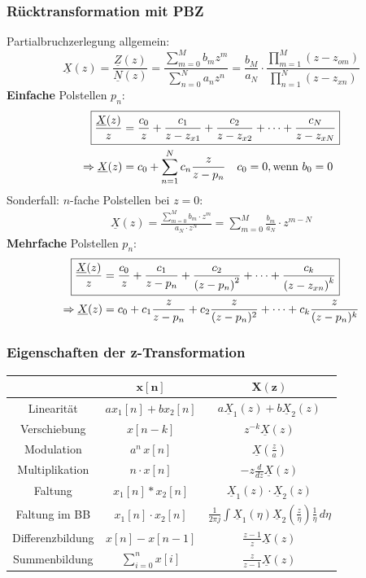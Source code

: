 \subsubsection{Rücktransformation mit PBZ}
Partialbruchzerlegung allgemein:
\[
\underline{X}(z)=\frac{\underline{Z}(z)}{\underline{N}(z)}=\frac{\sum_{m=0}^{M} b_{m} z^{m}}{\sum_{n=0}^{N} a_{n} z^{n}}=\frac{b_{M}}{a_{N}} \cdot \frac{\prod_{m=1}^{M}\left(z-z_{o m}\right)}{\prod_{n=1}^{N}\left(z-z_{x n}\right)}
\]
\textbf{Einfache} Polstellen $p_n$:
\begin{align*}
	\Aboxed{\frac{\underline{X}(z)}{z} & =\frac{c_{0}}{z}+\frac{c_{1}}{z-z_{x 1}}+\frac{c_{2}}{z-z_{x 2}}+\cdots+\frac{c_{N}}{z-z_{x N}}} \\
	\Rightarrow \underline{X}(z) &= c_0 + \sum_{n=1}^{N} c_n \frac{z}{z-p_n} \quad c_0=0, \text{wenn } b_0=0
\end{align*}
Sonderfall: $n$-fache Polstellen bei $z=0$:
\begin{align*}
	\underline{X}(z) = \frac{\sum_{m=0}^{M} b_m \cdot  z^m}{a_N \cdot z^N} = \sum_{m=0}^{M} \frac{b_m}{a_N} \cdot z^{m-N}
\end{align*}
\textbf{Mehrfache} Polstellen $p_n$:
\begin{align*}
	\Aboxed{\frac{\underline{X}(z)}{z} &=\frac{c_{0}}{z}+\frac{c_{1}}{z-p_n}+\frac{c_{2}}{\left(z-p_n\right)^{2}}+\cdots+\frac{c_{k}}{\left(z-z_{x n}\right)^{k}}}\\
			\Rightarrow \underline{X}(z) & = c_0 + c_1 \frac{z}{z-p_n}+c_2\frac{z}{(z-p_n)^2}+\cdots+c_k\frac{z}{(z-p_n)^k}
\end{align*}

\subsubsection{Eigenschaften der z-Transformation}
\renewcommand{\arraystretch}{1.7}
{\small 
\begin{tabularx}{\columnwidth}{|c|c|c|}
	\hline
	& $\mathbf{x[n]}$ & \underline{$\mathbf{X}$}$\mathbf{(z)}$\\
	\hline Linearität & $a x_{1}[n]+b x_{2}[n]$ & $a \underline{X}_{1}(z)+b\underline{X}_{2}(z)$ \\
	\hline Verschiebung	& $x[n-k]$ & $z^{-k} \underline{X}(z)$ \\
	\hline Modulation & $a^{n} \, x[n]$ & $\underline{X}\left(\frac{z}{a}\right)$ \\
	\hline Multiplikation & $n \cdot x[n] $ & $-z \frac{d}{d z} \underline{X}(z)$ \\
	\hline Faltung & $x_{1}[n] * x_{2}[n] $ & $ \underline{X}_{1}(z) \cdot \underline{X}_{2}(z)$ \\
	\hline Faltung im BB & $x_{1}[n] \cdot x_{2}[n] $ & $ \frac{1}{2\pi j} \int \underline{X}_1(\eta)\underline{X}_2(\frac{z}{\eta})\frac{1}{\eta}\, d\eta$ \\
	\hline Differenzbildung & $x[n]-x[n-1] $ & $ \frac{z-1}{z} \underline{X}(z)$ \\
	\hline Summenbildung & $\sum_{i=0}^{n} x[i] $ & $ \frac{z}{z-1} \underline{X}(z)$ \\
	\hline
\end{tabularx} }

